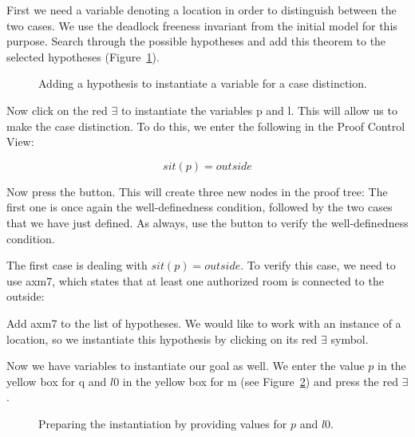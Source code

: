 First we need a variable denoting a location in order to distinguish between the two cases. We use the deadlock freeness invariant from the initial model for this purpose. Search through the possible hypotheses and add this theorem to the selected hypotheses (Figure~\ref{tut_10_ref_proof1}).

\begin{figure}[!ht]
\begin{center}
	\caption{Adding a hypothesis to instantiate a variable for a case distinction.}
	\label{tut_10_ref_proof1}
\end{center}
\end{figure}

Now click on the red $\exists$ to instantiate the variables p and l. This will allow us to make the case distinction. To do this, we enter the following in the Proof Control View:

$$ sit(p) = outside $$

Now press the  button.  This will create three new nodes in the proof tree: The first one is once again the well-definedness condition, followed by the two cases that we have just defined.  As always, use the  button to verify the well-definedness condition.

The first case is dealing with $sit(p) = outside$.  To verify this case, we need to use \textsf{axm7}, which states that at least one authorized room is connected to the outside:


Add \textsf{axm7} to the list of hypotheses.  We would like to work with an instance of a location, so we instantiate this hypothesis by clicking on its red $\exists$ symbol.


Now we have variables to instantiate our goal as well.  We enter the value $p$ in the yellow box for q and $l0$ in the yellow box for m (see Figure~\ref{tut_10_ref_proof2}) and press the red  $\exists$.

\begin{figure}[!ht]
\begin{center}
	\caption{Preparing the instantiation by providing values for $p$ and $l0$.}
	\label{tut_10_ref_proof2}
\end{center}
\end{figure}

